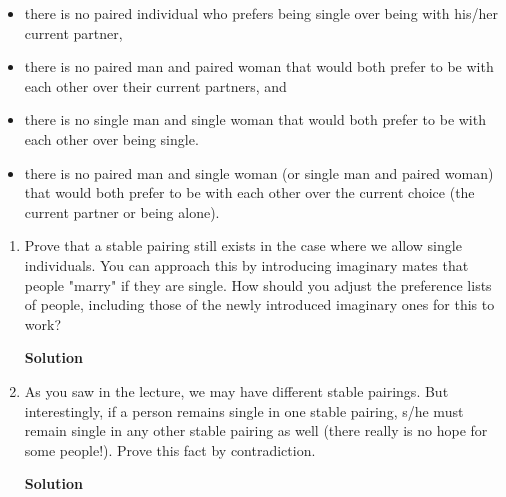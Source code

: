 \documentclass{article}
\begin{document}
\vspace{1mm}
\begin{itemize}
\item there is no paired individual who prefers being single over being with his/her current partner,
\item there is no paired man and paired woman that would both prefer to be with each other over their
current partners, and
\item there is no single man and single woman that would both prefer to be with each other over being
single.
\item there is no paired man and single woman (or single man and paired woman) that would both prefer to be with each other over the current choice (the current partner or being alone).
\end{itemize}
\begin{adjustwidth}{-0.1in}{}
\begin{enumerate}
\item Prove that a stable pairing still exists in the case where we allow single individuals. You can approach this by introducing imaginary mates that people "marry" if they are single. How should you adjust the preference lists of people, including those of the newly introduced imaginary ones for this to work?
\begin{mdframed}
\textbf{Solution}

\end{mdframed}

\item  As you saw in the lecture, we may have different stable pairings. But interestingly, if a person remains single in one stable pairing, s/he must remain single in any other stable pairing as well (there really is no hope for some people!). Prove this fact by contradiction.
\begin{mdframed}
\textbf{Solution}

\end{mdframed}

\end{enumerate}
\end{adjustwidth}

\clearpage
\end{document}
